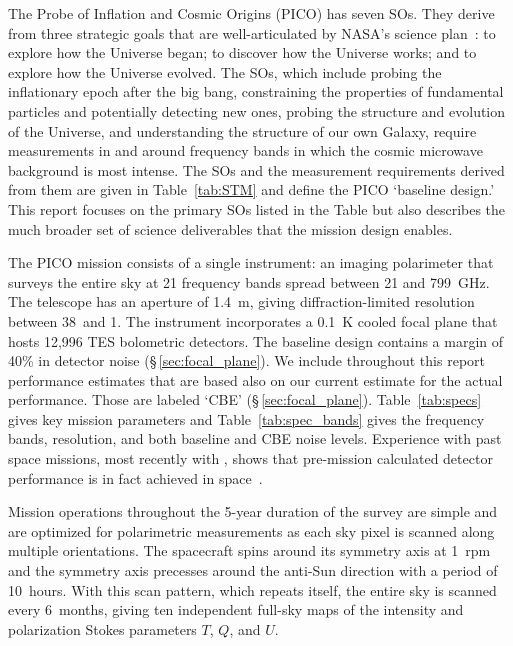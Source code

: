 \documentclass[PICOReport.tex]{subfiles}
\begin{document}
 
 
The Probe of Inflation and Cosmic Origins (PICO) has seven \ac{SOs}. They derive from three strategic goals that are well-articulated by NASA's science plan~\citep{latest_nasa_science_plan,latest_nasa_strategic_plan}: to explore how the Universe began; to discover how the Universe works; and to explore how the Universe evolved. The \ac{SOs}, which include probing the inflationary epoch after the big bang, constraining the properties of fundamental particles and potentially detecting new ones, probing the structure and evolution of the Universe, and understanding the structure of our own Galaxy, require measurements in and around frequency bands in which the cosmic microwave background is most intense. The \ac{SOs} and the measurement requirements derived from them are given in Table~\ref{tab:STM} and define the PICO `baseline design.' 
This report focuses on the primary \ac{SOs} listed in the Table but also describes the much broader set of science deliverables that the mission design enables.

The PICO mission consists of a single instrument: an imaging polarimeter that surveys the entire sky at 21 frequency bands spread between 21 and 799~GHz.  The telescope has an aperture of 1.4~m, giving diffraction-limited resolution between 38\arcmin\ and 1\arcmin . The instrument incorporates a 0.1~K cooled focal plane that hosts 12,996 \ac{TES} bolometric detectors. The baseline design contains a margin of 40\% in detector noise (\S\,\ref{sec:focal_plane}). We include throughout this report performance estimates that are based also on our current estimate for the actual performance. Those are labeled `\ac{CBE}' (\S\,\ref{sec:focal_plane}). Table~\ref{tab:specs} gives key mission parameters and Table~\ref{tab:spec_bands} gives the frequency bands, resolution, and both baseline and \ac{CBE} noise levels. Experience with past space missions, most recently with \planck , shows that pre-mission calculated detector performance is in fact achieved in space~\citep{planck1101.2038,planck1101.2039,Jarosik}.

Mission operations throughout the 5-year duration of the survey are simple and are optimized for polarimetric measurements as each sky pixel is scanned along multiple orientations. The spacecraft spins around its symmetry axis at 1~rpm and the symmetry axis precesses around the anti-Sun direction with a period of 10~hours. With this scan pattern, which repeats itself, the entire sky is scanned every 6~months, giving ten independent full-sky maps of the intensity and polarization Stokes parameters $T$, $Q$, and $U$.  
\end{document}
